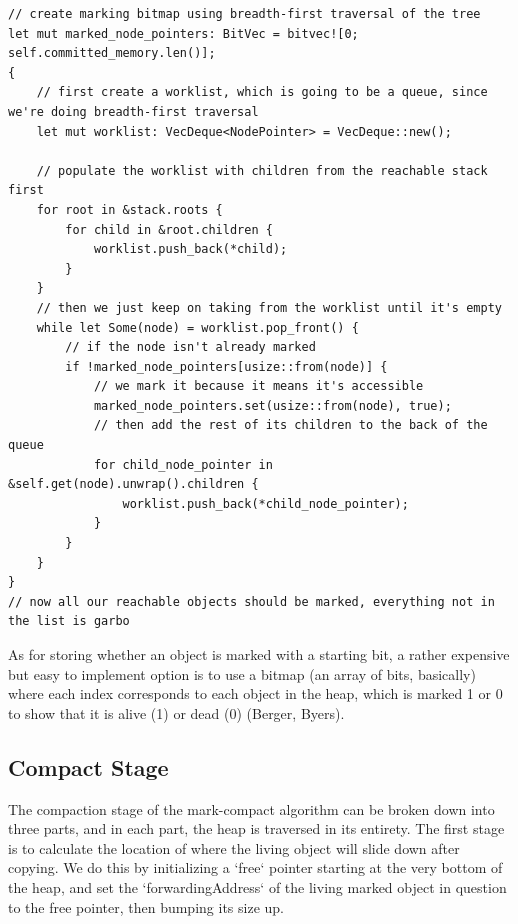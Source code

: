\documentclass[index]{subfiles}
\begin{document}
\begin{verbatim}
// create marking bitmap using breadth-first traversal of the tree
let mut marked_node_pointers: BitVec = bitvec![0; self.committed_memory.len()];
{
    // first create a worklist, which is going to be a queue, since we're doing breadth-first traversal
    let mut worklist: VecDeque<NodePointer> = VecDeque::new();

    // populate the worklist with children from the reachable stack first
    for root in &stack.roots {
        for child in &root.children {
            worklist.push_back(*child);
        }
    }
    // then we just keep on taking from the worklist until it's empty
    while let Some(node) = worklist.pop_front() {
        // if the node isn't already marked
        if !marked_node_pointers[usize::from(node)] {
            // we mark it because it means it's accessible
            marked_node_pointers.set(usize::from(node), true);
            // then add the rest of its children to the back of the queue
            for child_node_pointer in &self.get(node).unwrap().children {
                worklist.push_back(*child_node_pointer);
            }
        }
    }
}
// now all our reachable objects should be marked, everything not in the list is garbo
\end{verbatim}

As for storing whether an object is marked with a starting bit, a rather expensive but easy to implement option is to use a bitmap (an array of bits, basically) where each index corresponds to each object in the heap, which is marked 1 or 0 to show that it is alive (1) or dead (0) (Berger, Byers).

\subsection{Compact Stage}

The compaction stage of the mark-compact algorithm can be broken down into three parts, and in each part, the heap is traversed in its entirety. The first stage is to calculate the location of where the living object will slide down after copying. We do this by initializing a `free` pointer starting at the very bottom of the heap, and set the `forwardingAddress` of the living marked object in question to the free pointer, then bumping its size up.
\end{document}

